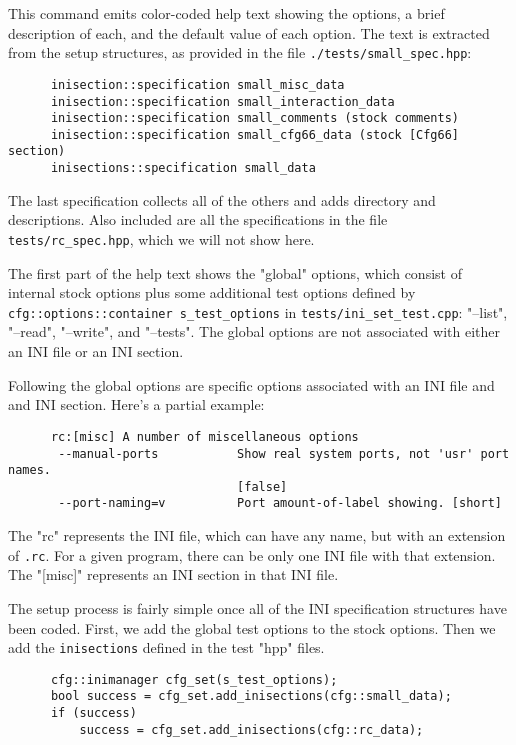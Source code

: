    This command emits color-coded help text showing the options, a brief
   description of each, and the default value of each option.
   The text is extracted from the setup structures, as provided in
   the file \texttt{./tests/small\_spec.hpp}:

   \begin{verbatim}
      inisection::specification small_misc_data
      inisection::specification small_interaction_data
      inisection::specification small_comments (stock comments)
      inisection::specification small_cfg66_data (stock [Cfg66] section)
      inisections::specification small_data
   \end{verbatim}

   The last specification collects all of the others and adds directory and
   descriptions.  Also included are all the specifications in the
   file \texttt{tests/rc\_spec.hpp}, which we will not show here.

   The first part of the help text shows the "global" options, which consist
   of internal stock options plus some additional test options
   defined by \texttt{cfg::options::container s\_test\_options} in
   \texttt{tests/ini\_set\_test.cpp}:
   "--list", "--read", "--write", and "--tests".
   The global options are not associated with either an INI file
   or an INI section.

   Following the global options are specific options associated with an
   INI file and and INI section.  Here's a partial example:

   \begin{verbatim}
      rc:[misc] A number of miscellaneous options
       --manual-ports           Show real system ports, not 'usr' port names.
                                [false]
       --port-naming=v          Port amount-of-label showing. [short]
   \end{verbatim}

   The "rc" represents the INI file, which can have any name, but with an
   extension of \texttt{.rc}.
   For a given program, there can be only one INI file with that extension.
   The "[misc]" represents an INI section in that INI file.

   The setup process is fairly simple once all of the INI specification
   structures have been coded. First, we add the global test options
   to the stock options. Then we add the \texttt{inisections}
   defined in the test "hpp" files.

   \begin{verbatim}
      cfg::inimanager cfg_set(s_test_options);
      bool success = cfg_set.add_inisections(cfg::small_data);
      if (success)
          success = cfg_set.add_inisections(cfg::rc_data);
   \end{verbatim}

